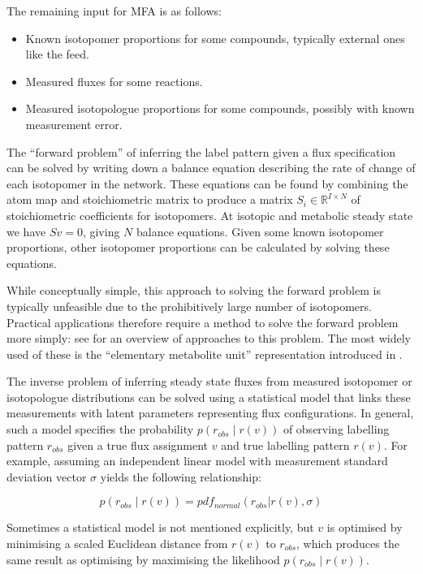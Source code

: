 \documentclass{article}
\begin{document}
The remaining input for MFA is as follows:

\begin{itemize}
\item
  Known isotopomer proportions for some compounds, typically external
  ones like the feed.
\item
  Measured fluxes for some reactions.
\item
  Measured isotopologue proportions for some compounds, possibly with
  known measurement error.
\end{itemize}

The ``forward problem'' of inferring the label pattern given a flux
specification can be solved by writing down a balance equation
describing the rate of change of each isotopomer in the network. These
equations can be found by combining the atom map and stoichiometric
matrix to produce a matrix \(S_i\in\mathbb{R}^{I\times N}\) of
stoichiometric coefficients for isotopomers. At isotopic and metabolic
steady state we have \(Sv=0\), giving \(N\) balance equations. Given
some known isotopomer proportions, other isotopomer proportions can be
calculated by solving these equations.

While conceptually simple, this approach to solving the forward problem
is typically unfeasible due to the prohibitively large number of
isotopomers. Practical applications therefore require a method to solve
the forward problem more simply: see
\citep[§3.1]{daiUnderstandingMetabolismFlux2017} for an overview of
approaches to this problem. The most widely used of these is the
``elementary metabolite unit'' representation introduced in
\citep{antoniewiczElementaryMetaboliteUnits2007}.

The inverse problem of inferring steady state fluxes from measured
isotopomer or isotopologue distributions can be solved using a
statistical model that links these measurements with latent parameters
representing flux configurations. In general, such a model specifies the
probability \(p(r_{obs}\mid r(v))\) of observing labelling pattern
\(r_{obs}\) given a true flux assignment \(v\) and true labelling
pattern \(r(v)\). For example, assuming an independent linear model with
measurement standard deviation vector \(\sigma\) yields the following
relationship:

\[
p(r_{obs}\mid r(v)) = pdf_{normal}(r_{obs} | r(v), \sigma)
\label{linear}
\]

Sometimes a statistical model is not mentioned explicitly, but \(v\) is
optimised by minimising a scaled Euclidean distance from \(r(v)\) to
\(r_{obs}\), which produces the same result as optimising by maximising
the likelihood \hyperref[linear]{\(p(r_{obs}\mid r(v))\)}.
\end{document}
